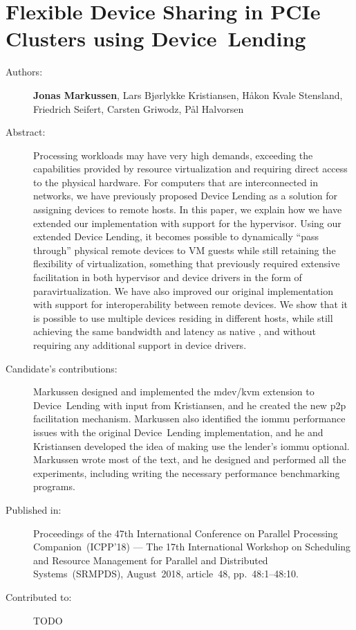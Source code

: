 \chapter{Flexible Device Sharing in PCIe Clusters using Device~Lending}
\label{paper:SRMPDS-2018}
\paperthumb

\begin{description}
	\item[Authors:]
		\textbf{Jonas Markussen}, Lars Bj{\o}rlykke Kristiansen, H{\aa}kon Kvale Stensland,
		Friedrich Seifert, Carsten Griwodz, P{\aa}l Halvorsen

	\item[Abstract:]
		Processing workloads may have very high  demands, exceeding the capabilities provided by resource
		virtualization and requiring direct access to the physical hardware.
		For computers that are interconnected in  networks, we have previously proposed 
		Device Lending as a solution for assigning devices to remote hosts. In this paper, we
		explain how we have extended our implementation with support for the  hypervisor.
		Using our extended Device Lending, it becomes possible to dynamically ``pass through'' physical remote devices
		to VM guests while still retaining the flexibility of virtualization, something that previously required
		extensive facilitation in both hypervisor and device drivers in the form of \gls{paravirtualization}.
		We have also improved our original implementation with support for interoperability between remote devices.
		We show that it is possible to use multiple devices residing in different hosts, while still achieving the same
		bandwidth and latency as native , and without requiring any additional support in device drivers. 


	\item[Candidate's contributions:]
		Markussen designed and implemented the \acrshort{mdev}/\acrshort{kvm} extension to Device~Lending with input from Kristiansen,
		and he created the new \acrshort{p2p} facilitation mechanism.
		Markussen also identified the \acrshort{iommu} performance issues with the original Device~Lending implementation, and he and Kristiansen
		developed the idea of making use the lender's \acrshort{iommu} optional.
		Markussen wrote most of the text, and he designed and performed all the experiments, including writing the necessary performance benchmarking 
		programs.

	\item[Published in:]
		Proceedings of the 47th International Conference on Parallel Processing Companion~(ICPP'18) ---
		The 17th International Workshop on Scheduling and Resource Management for Parallel and Distributed Systems~(SRMPDS),
		August~2018, article~48, pp.~48:1--48:10.

	\item[Contributed to:]
		TODO

\end{description}
